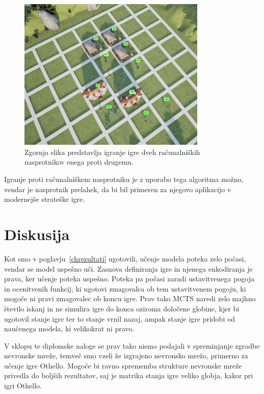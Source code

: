 \documentclass[a4paper, 12pt]{book}
\begin{document}
\begin{figure}[h]
	\begin{center}
		\includegraphics[width=0.8\textwidth]{visualization_ue4.pdf}
	\end{center}
	\caption{Zgornja slika predstavlja igranje igre dveh računalniških nasprotnikov enega proti drugemu.}
	\label{visualization_ue4}
\end{figure}

Igranje proti računalniškem nasprotniku je z uporabo tega algoritma možno, vendar je nasprotnik prelahek, da bi bil primeren za njegovo aplikacijo v modernejše strateške igre.

\chapter{Diskusija}
\label{chdiskusija}

Kot smo v poglavju~\ref{chrezultati} ugotovili, učenje modela poteka zelo počasi, vendar se model uspešno uči.
Zasnova definiranja igre in njenega enkodiranja je prava, ker učenje poteka uspešno.
Poteka pa počasi zaradi ustavitvenega pogoja in ocenitvenih funkcij, ki ugotovi zmagovalca ob tem ustavitvenem pogoju, ki mogoče ni pravi zmagovalec ob koncu igre.
Prav tako MCTS naredi zelo majhno število iskanj in ne simulira igre do konca oziroma določene globine, kjer bi ugotovil stanje igre ter to stanje vrnil nazaj, ampak stanje igre pridobi od naučenega modela, ki velikokrat ni pravo.



V sklopu te diplomske naloge se prav tako nismo podajali v spreminjanje zgradbe nevronske mreže, temveč smo vzeli že izgrajeno nevronsko mrežo, primerno za učenje igre Othello.
Mogoče bi ravno sprememba strukture nevronske mreže privedla do boljših rezultatov, saj je matrika stanja igre veliko globja, kakor pri igri Othello.
\end{document}
